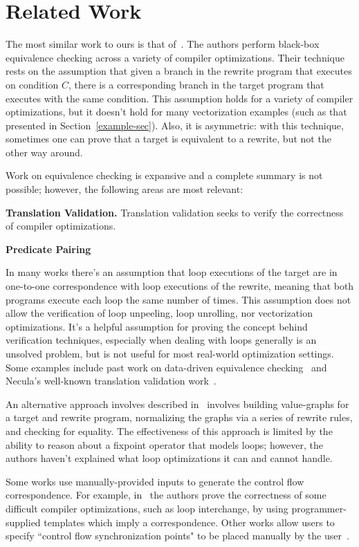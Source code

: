 \section{Related Work}

The most similar work to ours is that of~\cite{Dahiya17ASPLAS}. The
authors perform black-box equivalence checking across a variety of
compiler optimizations. Their technique rests on the assumption that
given a branch in the rewrite program that executes on condition $C$,
there is a corresponding branch in the target program that executes
with the same condition. This assumption holds for a variety of
compiler optimizations, but it doesn't hold for many vectorization
examples (such as that presented in Section~\ref{example-sec}). Also,
it is asymmetric: with this technique, sometimes one can prove that a
target is equivalent to a rewrite, but not the other way around.

Work on equivalence checking is expansive and a complete summary is
not possible; however, the following areas are most relevant:

\textbf{Translation Validation.}  Translation validation seeks to verify the correctness of compiler optimizations.

\textbf{Predicate Pairing}

In many works there's an assumption that loop executions of the
target are in one-to-one correspondence with loop executions of the
rewrite, meaning that both programs execute each loop the same number
of times. This assumption does not allow the verification of loop
unpeeling, loop unrolling, nor vectorization optimizations. It's
a helpful assumption for proving the concept behind verification
techniques, especially when dealing with loops generally is an
unsolved problem, but is not useful for most real-world optimization
settings. Some examples include past work on data-driven equivalence
checking~\cite{Sharma2013} and Necula's well-known translation
validation work~\cite{Necula2000}.

An alternative approach involves described in~\cite{Tristan2011}
involves building value-graphs for a target and rewrite program,
normalizing the graphs via a series of rewrite rules, and checking for
equality. The effectiveness of this approach is limited by the ability
to reason about a fixpoint operator that models loops; however, the
authors haven't explained what loop optimizations it can and cannot
handle.

Some works use manually-provided inputs to generate the control flow
correspondence. For example, in~\cite{Kundu2009} the authors prove
the correctness of some difficult compiler optimizations, such as
loop interchange, by using programmer-supplied templates which imply
a correspondence. Other works allow users to specify ``control flow
synchronization points" to be placed manually by the user~\cite{Kiefer2016}.

